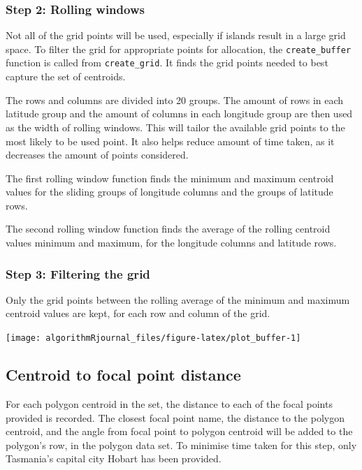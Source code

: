 \hypertarget{step-2-rolling-windows}{%
\subsubsection{Step 2: Rolling windows}\label{step-2-rolling-windows}}

Not all of the grid points will be used, especially if islands result in
a large grid space. To filter the grid for appropriate points for
allocation, the \texttt{create\_buffer} function is called from
\texttt{create\_grid}. It finds the grid points needed to best capture
the set of centroids.

The rows and columns are divided into 20 groups. The amount of rows in
each latitude group and the amount of columns in each longitude group
are then used as the width of rolling windows. This will tailor the
available grid points to the most likely to be used point. It also helps
reduce amount of time taken, as it decreases the amount of points
considered.

The first rolling window function finds the minimum and maximum centroid
values for the sliding groups of longitude columns and the groups of
latitude rows.

The second rolling window function finds the average of the rolling
centroid values minimum and maximum, for the longitude columns and
latitude rows.

\hypertarget{step-3-filtering-the-grid}{%
\subsubsection{Step 3: Filtering the
grid}\label{step-3-filtering-the-grid}}

Only the grid points between the rolling average of the minimum and
maximum centroid values are kept, for each row and column of the grid.

\begin{Schunk}

\texttt{[image: algorithmRjournal\_files/figure-latex/plot\_buffer-1]} \end{Schunk}

\hypertarget{centroid-to-focal-point-distance}{%
\subsection{Centroid to focal point
distance}\label{centroid-to-focal-point-distance}}

For each polygon centroid in the set, the distance to each of the focal
points provided is recorded. The closest focal point name, the distance
to the polygon centroid, and the angle from focal point to polygon
centroid will be added to the polygon's row, in the polygon data set. To
minimise time taken for this step, only Tasmania's capital city Hobart
has been provided.

